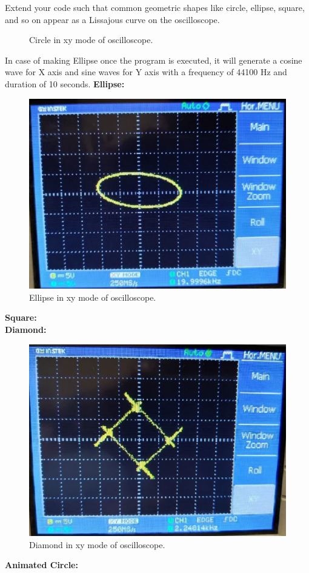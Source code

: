 \documentclass[11pt]{article}
\begin{document}
\begin{question}
\begin{subquestion}{Extend your code such that common geometric shapes like circle, ellipse, square, and so on appear as a Lissajous curve on the oscilloscope.}
{\begin{figure}[H]
		\caption{Circle in xy mode of oscilloscope.} \label{fig:cir2}
	\end{figure}
	In case of making Ellipse once the program is executed, it will generate a cosine wave for X axis and sine waves for Y axis with a frequency of 44100 Hz and duration of 10 seconds.
	\textbf{Ellipse:}\\
	
	\begin{figure}[H]
		\centering
		\includegraphics[scale=0.4,angle=0]{Fig/Ellipse.jpg}
		\caption{Ellipse in xy mode of oscilloscope.} \label{fig:cir2}
	\end{figure}
	\textbf{Square:}\\
	
	\textbf{Diamond:}\\
	
	\begin{figure}[H]
		\centering
		\includegraphics[scale=0.4,angle=0]{Fig/Diamond.jpg}
		\caption{Diamond in xy mode of oscilloscope.} \label{fig:cir2}
	\end{figure}
	\textbf{Animated Circle:}\\
	
}
\end{subquestion}


\end{question}
\end{document}
